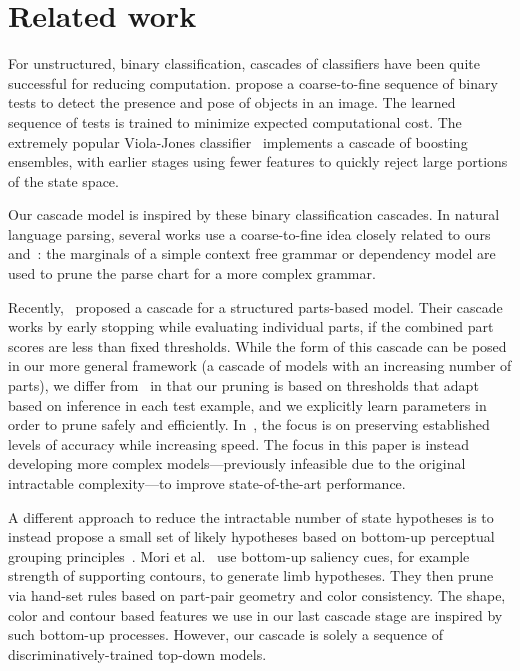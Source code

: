 \section{Related work}
For unstructured, binary classification, cascades of classifiers have been 
quite successful for reducing computation.  \citet{geman2001} propose a 
coarse-to-fine sequence of binary tests to detect the presence and pose of 
objects in an image.  The learned sequence of tests is trained to minimize 
expected computational cost.  The extremely popular Viola-Jones 
classifier~\citep{viola02} implements a cascade of boosting ensembles, with 
earlier stages using fewer features to quickly reject large portions of the 
state space.

Our cascade model is inspired by these binary classification cascades. In 
natural language parsing, several works \citep{carreras2008tag,petrov:PhD} use 
a coarse-to-fine idea closely related to ours and~\citet{geman2001}: the 
marginals of a simple context free grammar or dependency model are used to 
prune the parse chart for a more complex grammar.

Recently,~\citet{pff-cascade} proposed a cascade for a structured parts-based 
model.  Their cascade works by early stopping while evaluating individual 
parts, if the combined part scores are less than fixed thresholds.  While the 
form of this cascade can be posed in our more general framework (a cascade of 
models with an increasing number of parts), we differ from~\citet{pff-cascade} 
in that our pruning is based on thresholds that adapt based on inference in 
each test example, and we explicitly learn parameters in order to prune safely 
and efficiently. In~\citet{geman2001,viola02,pff-cascade}, the focus is on 
preserving established levels of accuracy while increasing speed.  The focus in 
this paper is instead developing more complex models---previously infeasible 
due to the original intractable complexity---to improve state-of-the-art 
performance.

A different approach to reduce the intractable number of state hypotheses is to instead propose a small set of likely hypotheses based on bottom-up perceptual grouping principles~\cite{mori04,Srinivasan07}.  Mori et al.~\cite{mori04} use bottom-up saliency cues, for example strength of supporting contours, to generate limb hypotheses.  They then prune via hand-set rules based on part-pair geometry and color consistency. The shape, color and contour based features we use in our last cascade stage are inspired by such bottom-up processes.  However, our cascade is solely a sequence of discriminatively-trained top-down models.



